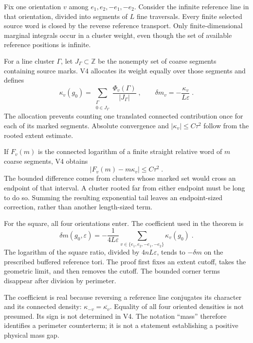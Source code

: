 \documentclass[11pt,a4paper]{article}
\begin{document}
Fix one orientation $v$ among $e_1,e_2,-e_1,-e_2$. Consider the infinite reference line in that orientation, divided into segments of $L$ fine traversals. Every finite selected source word is closed by the reverse reference transport. Only finite-dimensional marginal integrals occur in a cluster weight, even though the set of available reference positions is infinite.

For a line cluster $\Gamma$, let $J_\Gamma\subset\mathbb Z$ be the nonempty set of coarse segments containing source marks. V4 allocates its weight equally over those segments and defines
\begin{equation*}
    \kappa_v(g_0)
        =\sum_{\substack{\Gamma\\0\in J_\Gamma}}
            \frac{\Phi_v(\Gamma)}{|J_\Gamma|}\;,
    \qquad
    \delta m_v=-\frac{\kappa_v}{L\varepsilon}\;.
\end{equation*}
The allocation prevents counting one translated connected contribution once for each of its marked segments. Absolute convergence and $|\kappa_v|\leqslant  C\tau^2$ follow from the rooted extent estimate.

If $F_v(m)$ is the connected logarithm of a finite straight relative word of $m$ coarse segments, V4 obtains
\begin{equation*}
    |F_v(m)-m\kappa_v|\leqslant  C\tau^2\;.
\end{equation*}
The bounded difference comes from clusters whose marked set would cross an endpoint of that interval. A cluster rooted far from either endpoint must be long to do so. Summing the resulting exponential tail leaves an endpoint-sized correction, rather than another length-sized term.

For the square, all four orientations enter. The coefficient used in the theorem is
\begin{equation*}
    \delta m(g_0,\varepsilon)
        =-\frac{1}{4L\varepsilon}
            \sum_{v\in \{e_1,e_2,-e_1,-e_2\}}\kappa_v(g_0)\;.
\end{equation*}
The logarithm of the square ratio, divided by $4nL\varepsilon$, tends to $-\delta m$ on the prescribed buffered reference tori. The proof first fixes an extent cutoff, takes the geometric limit, and then removes the cutoff. The bounded corner terms disappear after division by perimeter.

The coefficient is real because reversing a reference line conjugates its character and its connected density: $\kappa_{-v}=\overline{\kappa_v}$. Equality of all four oriented densities is not presumed. Its sign is not determined in V4. The notation ``mass'' therefore identifies a perimeter counterterm; it is not a statement establishing a positive physical mass gap.
\end{document}
